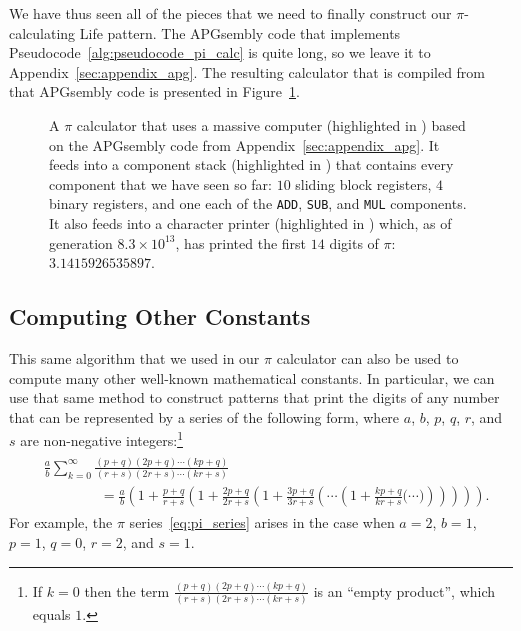 We have thus seen all of the pieces that we need to finally construct our $\pi$-calculating Life pattern. The APGsembly code that implements Pseudocode~\ref{alg:pseudocode_pi_calc} is quite long, so we leave it to Appendix~\ref{sec:appendix_apg}. The resulting calculator that is compiled from that APGsembly code is presented in Figure~\ref{fig:pi_calc}.

\begin{figure}[!htb]
	\centering
	\caption{A $\pi$ calculator that uses a massive computer (highlighted in ) based on the APGsembly code from Appendix~\ref{sec:appendix_apg}. It feeds into a component stack (highlighted in ) that contains every component that we have seen so far: $10$ sliding block registers, $4$ binary registers, and one each of the \texttt{ADD}, \texttt{SUB}, and \texttt{MUL} components. It also feeds into a character printer (highlighted in ) which, as of generation $8.3 \times 10^{13}$, has printed the first $14$ digits of $\pi$: $3.1415926535897$.}\label{fig:pi_calc}
\end{figure}


\subsection{Computing Other Constants}\label{sec:pi_calc_other}

This same algorithm that we used in our $\pi$ calculator can also be used to compute many other well-known mathematical constants. In particular, we can use that same method to construct patterns that print the digits of any number that can be represented by a series of the following form, where $a$, $b$, $p$, $q$, $r$, and $s$ are non-negative integers:\footnote{If $k = 0$ then the term $\frac{(p+q)(2p+q)\cdots(kp+q)}{(r+s)(2r+s)\cdots(kr+s)}$ is an ``empty product'', which equals $1$.}
\begin{align}\begin{split}\label{eq:generalized_pi_series}
		& \frac{a}{b}\sum_{k=0}^\infty \frac{(p+q)(2p+q)\cdots(kp+q)}{(r+s)(2r+s)\cdots(kr+s)} \\
		& \qquad\qquad = \frac{a}{b}\left(1 + \frac{p+q}{r+s}\left( 1 + \frac{2p+q}{2r+s}\left( 1 + \frac{3p+q}{3r+s}\left( \cdots \left( 1 + \frac{kp+q}{kr+s}\Big( \cdots \Big) \right)\right)\right)\right)\right).
\end{split}\end{align}
For example, the $\pi$ series~\eqref{eq:pi_series} arises in the case when $a = 2$, $b = 1$, $p = 1$, $q = 0$, $r = 2$, and $s = 1$.

